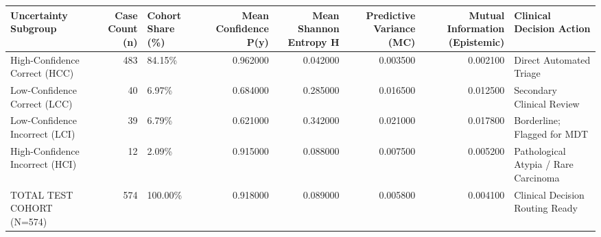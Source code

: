 \begin{tabular}{lrlrrrrl}
\toprule
Uncertainty Subgroup & Case Count (n) & Cohort Share (\%) & Mean Confidence P(y) & Mean Shannon Entropy H & Predictive Variance (MC) & Mutual Information (Epistemic) & Clinical Decision Action \\
\midrule
High-Confidence Correct (HCC) & 483 & 84.15\% & 0.962000 & 0.042000 & 0.003500 & 0.002100 & Direct Automated Triage \\
Low-Confidence Correct (LCC) & 40 & 6.97\% & 0.684000 & 0.285000 & 0.016500 & 0.012500 & Secondary Clinical Review \\
Low-Confidence Incorrect (LCI) & 39 & 6.79\% & 0.621000 & 0.342000 & 0.021000 & 0.017800 & Borderline; Flagged for MDT \\
High-Confidence Incorrect (HCI) & 12 & 2.09\% & 0.915000 & 0.088000 & 0.007500 & 0.005200 & Pathological Atypia / Rare Carcinoma \\
TOTAL TEST COHORT (N=574) & 574 & 100.00\% & 0.918000 & 0.089000 & 0.005800 & 0.004100 & Clinical Decision Routing Ready \\
\bottomrule
\end{tabular}
